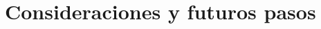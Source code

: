 \documentclass{subfiles}
\begin{document}
  \chapter{Consideraciones y futuros pasos}
  \label{chap:6}
\end{document}
